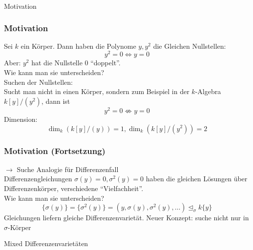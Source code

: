 \documentclass{beamer}
\def\s{\sigma}
\def\si{\unlhd_{\sigma}}
\theoremstyle{definition}
\begin{document}
\begin{frame}
\begin{center}
\LARGE Motivation
\end{center}
\end{frame}

\begin{frame}\frametitle{Motivation}
Sei $k$ ein Körper. Dann haben die Polynome $y, y^2$ die Gleichen Nullstellen: 
\[ y^2 = 0 \Leftrightarrow y = 0 \]
Aber: $y^2$ hat die Nullstelle $0$ ``doppelt''. \\
Wie kann man sie unterscheiden?\\
\vspace{10pt}
Suchen der Nullstellen: \\
Sucht man nicht in einen Körper, sondern zum Beispiel in der $k$-Algebra $k[y]/(y^2)$,
dann ist 
\[ y^2 = 0 \not \Leftrightarrow y = 0 \]
Dimension:
$$\dim_k(k[y]/(y)) = 1, \dim_k(k[y]/(y^2)) = 2$$
\end{frame}




\begin{frame}\frametitle{Motivation (Fortsetzung)}
$\rightarrow$ Suche Analogie für Differenzenfall \\
$\phantom{ }$ \\
Differenzengleichungen $\s(y) = 0, \s^2(y) = 0$ haben die gleichen Lösungen über Differenzenkörper,
verschiedene ``Vielfachheit''.\\
Wie kann man sie unterscheiden?
\[ \{ \s(y) \} = \{ \s^2(y) \} = (y,\s(y),\s^2(y),\ldots) \si k\{y\} \]
Gleichungen liefern gleiche Differenzenvarietät. Neuer Konzept: suche nicht nur in $\s$-Körper
\end{frame}

\begin{frame}
\begin{center}
\LARGE Mixed Differenzenvarietäten
\end{center}
\end{frame}
\end{document}
